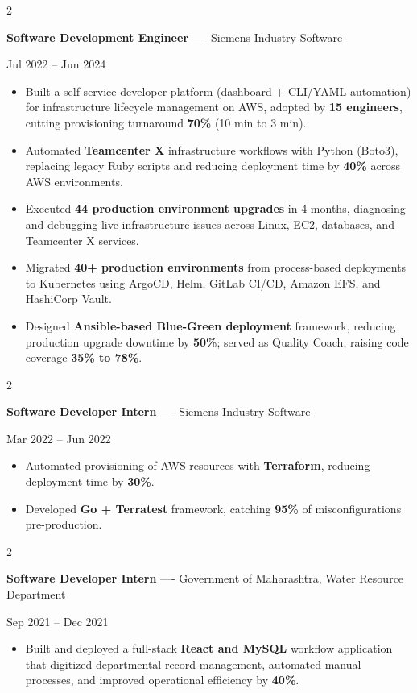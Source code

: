 \documentclass[10pt, letterpaper]{article}
\newenvironment{highlights}{
    \begin{itemize}[
        topsep=0.10 cm,
        parsep=0.06 cm,
        partopsep=0pt,
        itemsep=0.06 cm,
        leftmargin=12pt
    ]
}{
    \end{itemize}
}
\newenvironment{twocolentry}[2][]{
    \onecolentry
    \def\secondColumn{#2}
    \setcolumnwidth{\fill, 4.5 cm}
    \begin{paracol}{2}
}{
    \switchcolumn \raggedleft \secondColumn
    \end{paracol}
    \endonecolentry
}
\begin{document}
\vspace{0.15 cm}

\begin{twocolentry}{Jul 2022 -- Jun 2024}
\textbf{Software Development Engineer} ---- Siemens Industry Software
\end{twocolentry}
\begin{highlights}
  \item Built a self-service developer platform (dashboard + CLI/YAML automation) for infrastructure lifecycle management on AWS, adopted by \textbf{15 engineers}, cutting provisioning turnaround \textbf{70\%} (10 min to 3 min).
  \item Automated \textbf{Teamcenter X} infrastructure workflows with Python (Boto3), replacing legacy Ruby scripts and reducing deployment time by \textbf{40\%} across AWS environments.
  \item Executed \textbf{44 production environment upgrades} in 4 months, diagnosing and debugging live infrastructure issues across Linux, EC2, databases, and Teamcenter X services.
  \item Migrated \textbf{40+ production environments} from process-based deployments to Kubernetes using ArgoCD, Helm, GitLab CI/CD, Amazon EFS, and HashiCorp Vault.
  \item Designed \textbf{Ansible-based Blue-Green deployment} framework, reducing production upgrade downtime by \textbf{50\%}; served as Quality Coach, raising code coverage \textbf{35\% to 78\%}.
\end{highlights}

\vspace{0.15 cm}

\begin{twocolentry}{Mar 2022 -- Jun 2022}
\textbf{Software Developer Intern} ---- Siemens Industry Software
\end{twocolentry}
\begin{highlights}
  \item Automated provisioning of AWS resources with \textbf{Terraform}, reducing deployment time by \textbf{30\%}.
  \item Developed \textbf{Go + Terratest} framework, catching \textbf{95\%} of misconfigurations pre-production.
\end{highlights}

\vspace{0.15 cm}

\begin{twocolentry}{Sep 2021 -- Dec 2021}
\textbf{Software Developer Intern} ---- Government of Maharashtra, Water Resource Department
\end{twocolentry}
\begin{highlights}
  \item Built and deployed a full-stack \textbf{React and MySQL} workflow application that digitized departmental record management, automated manual processes, and improved operational efficiency by \textbf{40\%}.
\end{highlights}
\end{document}
